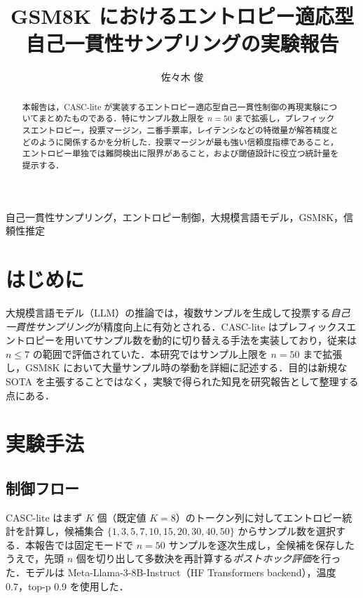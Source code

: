 \documentclass{ipsj}
\title{GSM8K におけるエントロピー適応型自己一貫性サンプリングの実験報告}
\author{佐々木 俊}{sasakishun@example.com}
\begin{document}
\maketitle

\begin{abstract}
本報告は，CASC-lite が実装するエントロピー適応型自己一貫性制御の再現実験についてまとめたものである．特にサンプル数上限を $n=50$ まで拡張し，プレフィックスエントロピー，投票マージン，二番手票率，レイテンシなどの特徴量が解答精度とどのように関係するかを分析した．投票マージンが最も強い信頼度指標であること，エントロピー単独では難問検出に限界があること，および閾値設計に役立つ統計量を提示する．
\end{abstract}

\begin{keywords}
自己一貫性サンプリング，エントロピー制御，大規模言語モデル，GSM8K，信頼性推定
\end{keywords}

\section{はじめに}
大規模言語モデル（LLM）の推論では，複数サンプルを生成して投票する\textit{自己一貫性サンプリング}が精度向上に有効とされる．CASC-lite\cite{original-report} はプレフィックスエントロピーを用いてサンプル数を動的に切り替える手法を実装しており，従来は $n \leq 7$ の範囲で評価されていた．本研究ではサンプル上限を $n=50$ まで拡張し，GSM8K\cite{gsm8k} において大量サンプル時の挙動を詳細に記述する．目的は新規な SOTA を主張することではなく，実験で得られた知見を研究報告として整理する点にある．

\section{実験手法}
\subsection{制御フロー}
CASC-lite はまず $K$ 個（既定値 $K=8$）のトークン列に対してエントロピー統計を計算し，候補集合 $\{1,3,5,7,10,15,20,30,40,50\}$ からサンプル数を選択する．本報告では固定モードで $n=50$ サンプルを逐次生成し，全候補を保存したうえで，先頭 $n$ 個を切り出して多数決を再計算する\textit{ポストホック評価}を行った．モデルは Meta-Llama-3-8B-Instruct（HF Transformers backend），温度 0.7，top-p 0.9 を使用した．
\end{document}
